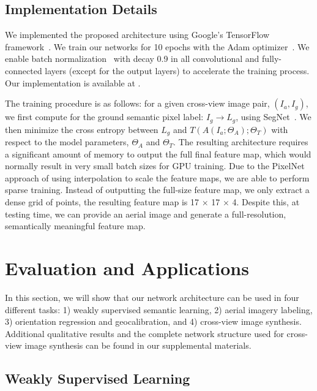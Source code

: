\subsection{Implementation Details}
\label{sec:details}

We implemented the proposed architecture using Google's TensorFlow
framework~\cite{abadi2016tensorflow}. We train our networks for 10
epochs with the Adam optimizer~\cite{kingma2014adam}. We enable batch
normalization~\cite{ioffe2015batch} with decay 0.9 in all convolutional and 
fully-connected layers (except for the output layers) to accelerate
the training process. Our implementation is available at .

The training procedure is as follows: for a given cross-view image
pair, $(I_a, I_g)$, we first compute for the ground semantic pixel
label: $I_g \rightarrow L_g$, using
SegNet~\cite{badrinarayanan2015segnet}. We then minimize the cross
entropy between $L_g$ and $T(A(I_a;\Theta_A);\Theta_T)$ with respect
to the model parameters, $\Theta_A$ and $\Theta_T$.  The resulting
architecture requires a significant amount of memory to output the
full final feature map, which would normally result in very small
batch sizes for GPU training.  Due to the PixelNet approach of using
interpolation to scale the feature maps, we are able to perform sparse
training. Instead of outputting the full-size feature map, we only
extract a dense grid of points, the resulting feature map is 17
$\times$ 17 $\times$ 4.  Despite this, at testing time,  we can provide
an aerial image and generate a full-resolution, semantically meaningful
feature map.

\section{Evaluation and Applications}
\label{sec:evaluation}
In this section, we will show that our network architecture can be
used in four different tasks: 1) weakly supervised semantic learning, 
2) aerial imagery labeling, 3) orientation regression and geocalibration, 
and 4) cross-view image synthesis. Additional qualitative results and 
the complete network structure used for cross-view image synthesis 
can be found in our supplemental materials.

\subsection{Weakly Supervised Learning}
\label{sec:transfer}

